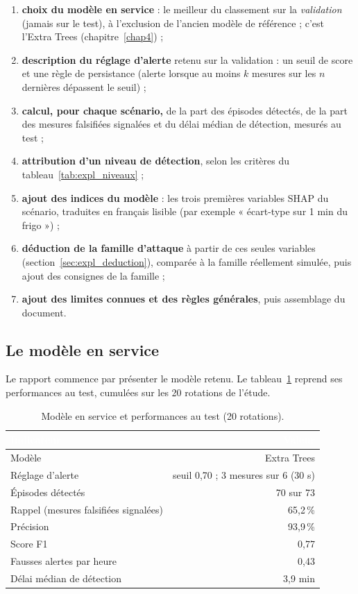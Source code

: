\begin{enumerate}
  \item \textbf{choix du modèle en service} : le meilleur du classement sur
        la \emph{validation} (jamais sur le test), à l'exclusion de l'ancien
        modèle de référence ; c'est l'Extra Trees (chapitre~\ref{chap4}) ;
  \item \textbf{description du réglage d'alerte} retenu sur la validation :
        un seuil de score et une règle de persistance (alerte lorsque au
        moins $k$ mesures sur les $n$ dernières dépassent le seuil) ;
  \item \textbf{calcul, pour chaque scénario,} de la part des épisodes
        détectés, de la part des mesures falsifiées signalées et du délai
        médian de détection, mesurés au test ;
  \item \textbf{attribution d'un niveau de détection}, selon les critères du
        tableau~\ref{tab:expl_niveaux} ;
  \item \textbf{ajout des indices du modèle} : les trois premières variables
        SHAP du scénario, traduites en français lisible (par exemple
        « écart-type sur 1 min du frigo ») ;
  \item \textbf{déduction de la famille d'attaque} à partir de ces seules
        variables (section~\ref{sec:expl_deduction}), comparée à la famille
        réellement simulée, puis ajout des consignes de la famille ;
  \item \textbf{ajout des limites connues et des règles générales}, puis
        assemblage du document.
\end{enumerate}

\subsection{Le modèle en service}

Le rapport commence par présenter le modèle retenu. Le
tableau~\ref{tab:expl_modele} reprend ses performances au test, cumulées sur
les 20 rotations de l'étude.

\begin{table}[H]
\centering
\small
\renewcommand{\arraystretch}{1.3}
\caption{Modèle en service et performances au test (20 rotations).}
\label{tab:expl_modele}
\begin{tabular}{|l|r|}
\hline
\rowcolor{thead}
\textcolor{white}{\textbf{Indicateur}} & \textcolor{white}{\textbf{Valeur}} \\
\hline
Modèle & Extra Trees \\
\rowcolor{trowa}
Réglage d'alerte & seuil 0,70 ; 3 mesures sur 6 (30 s) \\
Épisodes détectés & 70 sur 73 \\
\rowcolor{trowa}
Rappel (mesures falsifiées signalées) & 65,2\,\% \\
Précision & 93,9\,\% \\
\rowcolor{trowa}
Score F1 & 0,77 \\
Fausses alertes par heure & 0,43 \\
\rowcolor{trowa}
Délai médian de détection & 3,9 min \\
\hline
\end{tabular}
\end{table}


